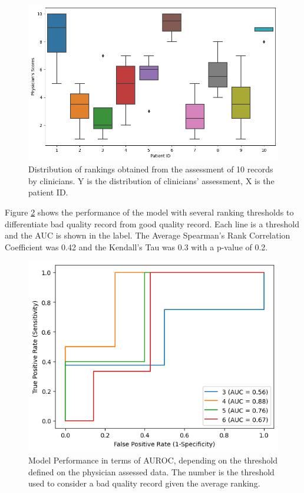\begin{figure}[htbp]
\centering
\caption{Distribution of rankings obtained from the assessment of 10 records by clinicians. Y is the distribution of clinicians' assessment, X is the patient ID.}\label{fig:clinical} 
\includegraphics[scale=0.52]{imgs/clinical_assessment_no_model.png}
\end{figure}

Figure \ref{fig:auc_changes} shows the performance of the model with several ranking thresholds to differentiate bad quality record from good quality record. Each line is a threshold and the AUC is shown in the label. The Average Spearman's Rank Correlation Coefficient was 0.42 and the Kendall's Tau was 0.3 with a p-value of 0.2.

\begin{figure}[htbp]
    \centering
    \caption{Model Performance in terms of AUROC, depending on the threshold defined on the physician assessed data. The number is the threshold used to consider a bad quality record given the average ranking.}\label{fig:auc_changes} 
    \includegraphics[scale=0.78]{imgs/auroc_curve_threshold.png}
    \end{figure}
